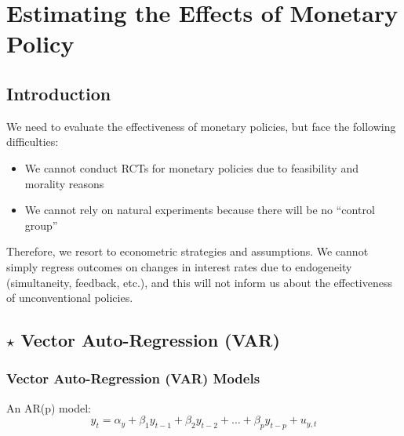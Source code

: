 \chapter[Estimating the Effects of Monetary Policy]{Estimating the Effects of Monetary Policy\raisebox{.3\baselineskip}{\normalsize\footnotemark}}


\section{Introduction}

    We need to evaluate the effectiveness of monetary policies, but face the following difficulties:
    
    \begin{itemize}
        \item We cannot conduct RCTs for monetary policies due to feasibility and morality reasons
        \item We cannot rely on natural experiments because there will be no ``control group''
    \end{itemize}

    Therefore, we resort to econometric strategies and assumptions. We cannot simply regress outcomes on changes in interest rates due to endogeneity (simultaneity, feedback, etc.), and this will not inform us about the effectiveness of unconventional policies.

\section{$\star$ Vector Auto-Regression (VAR)}

    \subsection{Vector Auto-Regression (VAR) Models}

        An AR(p) model:
        \begin{equation*}
            y_t = \alpha_y + \beta_1 y_{t-1} + \beta_2 y_{t-2} + \dots + \beta_p y_{t-p} + u_{y,t}
        \end{equation*}

